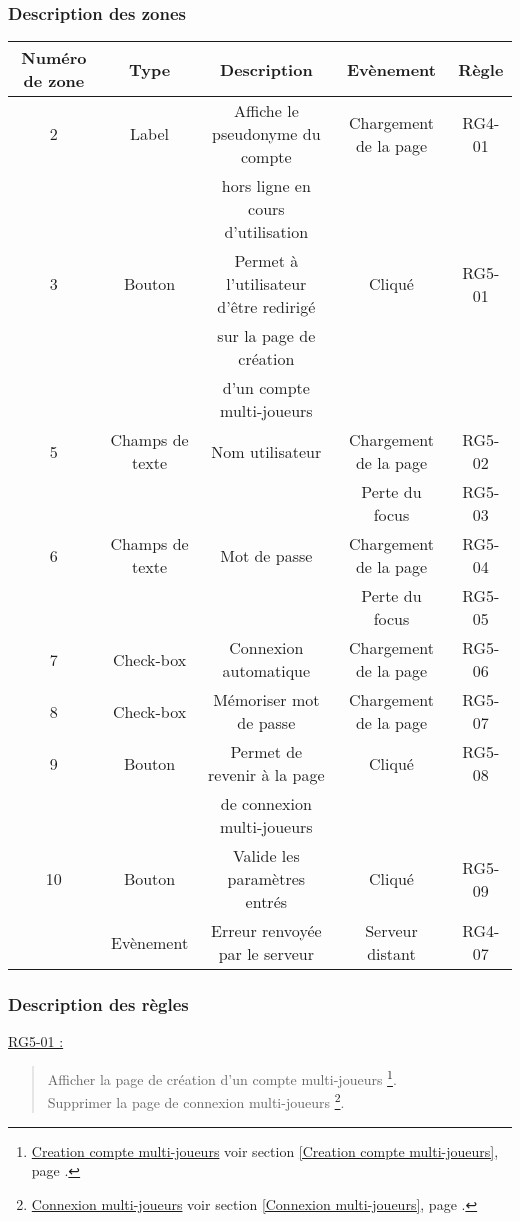 \documentclass{report}
\begin{document}
		\subsubsection{Description des zones}
		
			\begin{tabular}{|c|c|c|c|c|} \hline
				Numéro de zone & Type  & Description & Evènement &	Règle \\\hline
				2 & Label & Affiche le pseudonyme du compte & Chargement de la page & RG4-01 \\
				  &       & hors ligne en cours d'utilisation & & \\\hline
				3 & Bouton & Permet à l'utilisateur d'être redirigé & Cliqué & RG5-01\\
				  &        & sur la page de création  & & \\
				  &        & d'un compte multi-joueurs \footnotemark[1] & & \\\hline
				5 & Champs de texte & Nom utilisateur & Chargement de la page & RG5-02 \\
				  &                 &                 & Perte du focus & RG5-03\\\hline 
				6 & Champs de texte & Mot de passe & Chargement de la page & RG5-04 \\
				  &                 &                 & Perte du focus & RG5-05\\\hline 
				7 & Check-box & Connexion automatique & Chargement de la page & RG5-06 \\\hline 
				8 & Check-box & Mémoriser mot de passe & Chargement de la page & RG5-07 \\\hline 
				9 & Bouton & Permet de revenir à la page & Cliqué & RG5-08 \\
				  &        & de connexion multi-joueurs \footnotemark[2] & & \\\hline
				10 & Bouton & Valide les paramètres entrés & Cliqué & RG5-09 \\\hline
				  & Evènement & Erreur renvoyée par le serveur & Serveur distant & RG4-07 \\\hline
			\end{tabular}

		\subsubsection{Description des règles}

			\underline{RG5-01 :}
				\begin{quote}
					Afficher la page de création d'un compte multi-joueurs%
						\footnote[1]{
							\hyperlink{Creation compte multi-joueurs}{Creation compte multi-joueurs}
							\og voir section \ref{Creation compte multi-joueurs}, page \pageref{Creation compte multi-joueurs}.\fg
						}.\\
					Supprimer la page de connexion multi-joueurs%
						\footnote[2]{
							\hyperlink{Connexion multi-joueurs}{Connexion multi-joueurs}
							\og voir section \ref{Connexion multi-joueurs}, page \pageref{Connexion multi-joueurs}.\fg
						}.
				\end{quote}	
\end{document}
